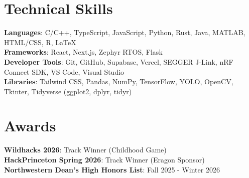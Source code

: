 \documentclass[letterpaper,11pt]{article}
\begin{document}
\section{Technical Skills}
 \begin{itemize}[leftmargin=0.15in, label={}]
    \small{\item{
     \textbf{Languages}{: C/C++, TypeScript, JavaScript, Python, Rust, Java, MATLAB, HTML/CSS, R, LaTeX} \\
     \textbf{Frameworks}{: React, Next.js, Zephyr RTOS, Flask} \\
     \textbf{Developer Tools}{: Git, GitHub, Supabase, Vercel, SEGGER J-Link, nRF Connect SDK, VS Code, Visual Studio} \\
     \textbf{Libraries}{: Tailwind CSS, Pandas, NumPy, TensorFlow, YOLO, OpenCV, Tkinter, Tidyverse (ggplot2, dplyr, tidyr)}
    }}
 \end{itemize}


\section{Awards}
 \begin{itemize}[leftmargin=0.15in, label={}]
    \small{\item{
     \textbf{Wildhacks 2026}{: Track Winner (Childhood Game)} \\
     \textbf{HackPrinceton Spring 2026}{: Track Winner (Eragon Sponsor)} \\
     \textbf{Northwestern Dean's High Honors List}{: Fall 2025 - Winter 2026} \\

     
    }}
 \end{itemize}
\end{document}
